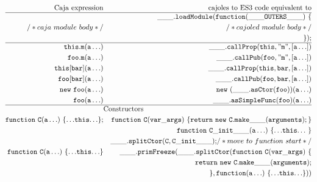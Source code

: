 \documentclass[letterpaper,twocolumn,10pt]{article}
\newcommand{\code}[1]{{\tt {#1}}}              %
\begin{document}
\begin{figure}
\begin{eqnarray}
  \mathrm{Caja\ expression} & \nonumber                & \mathrm{cajoles\ to\ ES3\ code\ equivalent\ to} \\ 
  \hline
                            & \label{module}           & \code{\_\_\_.loadModule(function(\_\_\_OUTERS\_\_\_)\ \{} \\
  /*caja\ module\ body*/    & \nonumber                & \code{\ \ } /*cajoled\ module\ body*/ \\
                            & \nonumber                & \code{\});} \\
  \hline
  \code{this.m(a\ldots)}   & \label{call:internal}     & \code{\_\_\_.callProp(this,"m",[a\ldots])} \\
  \code{foo.m(a\ldots)}    & \label{call:public}       & \code{\_\_\_.callPub(foo,"m",[a\ldots])} \\
  \code{this[bar](a\ldots)} & \label{call:index-internal} & \code{\_\_\_.callProp(this,bar,[a\ldots])} \\
  \code{foo[bar](a\ldots)} & \label{call:index-public} & \code{\_\_\_.callPub(foo,bar,[a\ldots])} \\
  \code{new\ foo(a\ldots)} & \label{new:ctor}          & \code{new\ (\_\_\_.asCtor(foo))(a\ldots)} \\
  \code{foo(a\ldots)}      & \label{call:func}         & \code{\_\_\_.asSimpleFunc(foo)(a\ldots)} \\
  \hline
   \nonumber & \lefteqn{\mathrm{Constructors}} & \\
  \code{function\ C(a\ldots)\ \{{\ldots}this{\ldots}\};} 
             & \label{func:ctor-decl} & \code{function\ C(var\_args)\ \{ return\ new\ C.make\_\_\_(arguments); \}} \\
             & \nonumber              & \code{function\ C\_init\_\_\_(a\ldots)\ \{ {\ldots}this{\ldots}\ \}} \\
             & \nonumber              & \code{\_\_\_.splitCtor(C,C\_init\_\_\_);} /*move\ to\ function\ start*/ \\
  \code{function\ C(a\ldots)\ \{{\ldots}this{\ldots}\}}      
             & \label{func:ctor-expr} & \code{\_\_\_.primFreeze(\_\_\_.splitCtor(function\ C(var\_args)\ \{}\\
             & \nonumber              & \code{\ \ return\ new\ C.make\_\_\_(arguments);} \\
             & \nonumber              & \code{\}, function(a\ldots)\ \{{\ldots}this{\ldots}\}))} \\

\end{eqnarray}
\end{figure}
\end{document}
